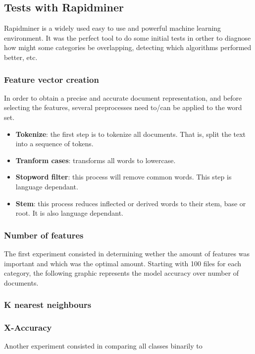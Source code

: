 \subsection{Tests with Rapidminer}
Rapidminer\cite{rapidminer} is a widely used easy to use and powerful machine learning environment.  
It was the perfect tool to do some initial tests in orther to diagnose how might some categories be overlapping, detecting which algorithms performed better, etc.

\subsubsection{Feature vector creation}
In order to obtain a precise and accurate document representation, and before selecting the features, several preprocesses need to/can be applied to the word set.
\begin{itemize}
  \item {\bf Tokenize}: the first step is to tokenize all documents. That is, split the text into a sequence of tokens. 
  \item {\bf Tranform cases}: transforms all words to lowercase.
  \item {\bf Stopword filter}: this process will remove common words. This step is language dependant.
  \item {\bf Stem}: this process reduces inflected or derived words to their stem, base or root. It is also language dependant.
\end{itemize}



\subsubsection{Number of features}
The first experiment consisted in determining wether the amount of features was important and which was the optimal amount. Starting with 100 files for each category, the following graphic
represents the model accuracy over number of documents. 

\subsubsection{K nearest neighbours}

\subsubsection{X-Accuracy}
Another experiment consisted in comparing all classes binarily to  


